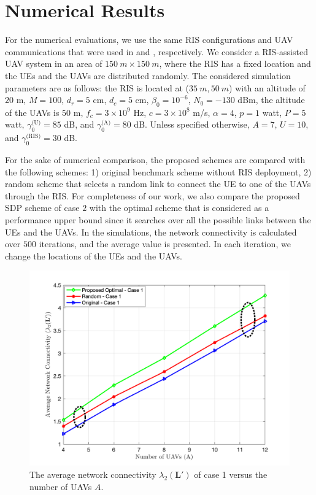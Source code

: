 \documentclass[conference]{IEEEtran}
\begin{document}
\section{Numerical Results}\label{NR}
For the numerical evaluations, we use the same  RIS configurations and UAV communications that were used in \cite{8292633} and \cite{9293155}, respectively. We consider a RIS-assisted UAV system in an area of $150 ~m \times 150 ~m$, where the RIS has a fixed location and the UEs and the UAVs are distributed randomly. The considered simulation parameters are as follows: the RIS  is located at ($35~m, 50~m$) with an altitude of $20$ m,  $M=100$, $d_r=5$ cm, $d_c=5$ cm, $\beta_0=10^{-6}$, $N_0=-130$ dBm, the altitude of the UAVs is $50$ m, $f_c=3\times10^9$ Hz, $c=3\times 10^8$ m/s, $\alpha=4$, $p=1$ watt, $P=5$ watt, $\gamma_0^\text{(U)}=85$ dB, and $\gamma_0^\text{(A)}=80$ dB. Unless specified otherwise, $A=7$, $U=10$, and $\gamma^\text{(RIS)}_0=30$ dB.  

For the sake of numerical comparison, the proposed schemes are compared with the following schemes: 1) original  benchmark scheme without RIS deployment, 2) random scheme that selects a random link to connect the UE to one of the UAVs through the RIS.  For completeness of our work, we also compare the proposed SDP scheme of case $2$  with the optimal scheme that is considered as a performance upper bound since it searches over all the possible links between the UEs and the UAVs. In the simulations, the network connectivity is calculated over $500$ iterations, and the average value is presented. In each iteration, we change the locations of the UEs and the UAVs.

\begin{figure}[t!]
			\begin{center}
				\includegraphics[width=0.95\linewidth, draft=false]{FigUAVcase1.png}
				\caption{The average network connectivity $\lambda_2(\mathbf L')$ of case 1 versus the number of UAVs $A$.}
     \vspace{-5.5mm}
			\end{center}
   \label{fig2_case1}
		\end{figure}
\end{document}

